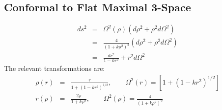 \documentclass[10pt,letterpaper]{article}
\numberwithin{equation}{section}
\begin{document}
\begin{appendices}
\section{Conformal to Flat Maximal 3-Space}
\begin{eqnarray}
ds^2 &=& \Omega^2(\rho)\left( d\rho^2 + \rho^2 d\Omega^2\right)
\nonumber\\
&=& \frac{4}{\left(1+k\rho^2\right)^2}\left( d\rho^2 + \rho^2 d\Omega^2\right)
\nonumber\\
&=& \frac{dr^2}{1-kr^2} + r^2 d\Omega^2
\label{dscf}
\end{eqnarray}
The relevant transformations are:
\begin{eqnarray}
\rho(r) &=& \frac{r}{1+\left(1-kr^2\right)^{1/2}},\qquad \Omega^2(r) = \left[1+\left(1-kr^2\right)^{1/2}\right]
\nonumber\\
r(\rho) &=& \frac{2\rho}{1+k\rho^2},\qquad \Omega^2(\rho) = \frac{4}{\left(1+k\rho^2\right)^2}
\end{eqnarray}




\end{appendices}
\end{document}
